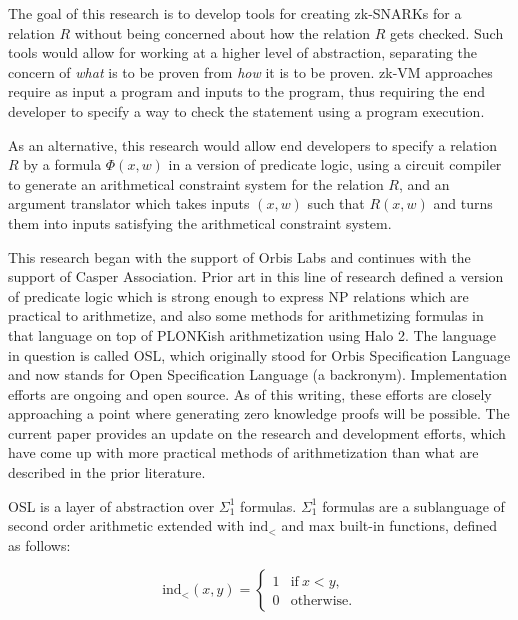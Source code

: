 \documentclass[11pt]{article}
\begin{document}
The goal of this research is to develop tools for creating zk-SNARKs for a relation $R$ without being concerned about how the relation $R$ gets checked. Such tools would allow for working at a higher level of abstraction, separating the concern of \emph{what}\/ is to be proven from \emph{how}\/ it is to be proven. zk-VM approaches require as input a program and inputs to the program, thus requiring the end developer to specify a way to check the statement using a program execution.

As an alternative, this research would allow end developers to specify a relation $R$ by a formula $\Phi(x, w)$ in a version of predicate logic, using a circuit compiler to generate an arithmetical constraint system for the relation $R$, and an argument translator which takes inputs $(x, w)$ such that $R(x, w)$ and turns them into inputs satisfying the arithmetical constraint system.

This research began with the support of Orbis Labs and continues with the support of Casper Association. Prior art in this line of research \cite{sigma11,osl-paper,osl-poly-bounds} defined a version of predicate logic which is strong enough to express NP relations which are practical to arithmetize, and also some methods for arithmetizing formulas in that language on top of PLONKish arithmetization using Halo 2. \cite{halo2-book,halo2-github} The language in question is called OSL, which originally stood for Orbis Specification Language and now stands for Open Specification Language (a backronym). Implementation efforts \cite{osl-github} are ongoing and open source. As of this writing, these efforts are closely approaching a point where generating zero knowledge proofs will be possible. The current paper provides an update on the research and development efforts, which have come up with more practical methods of arithmetization than what are described in the prior literature.

OSL is a layer of abstraction over $\Sigma^1_1$ formulas. $\Sigma^1_1$ formulas are a sublanguage of second order arithmetic \cite{simpson} extended with $\text{ind}_<$ and max built-in functions, defined as follows:

\begin{equation}
	\text{ind}_<(x, y) = \begin{cases}
		1 & \text{if}\ x < y, \\
		0 & \text{otherwise}.
	\end{cases}
\end{equation}
\end{document}
